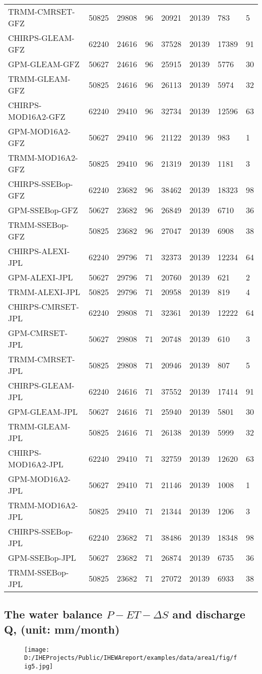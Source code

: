 \documentclass[oneside,openany]{article}%
\begin{document}
\begin{longtable}{|l|l|l|l|l|l|l|l|}
TRMM-CMRSET-GFZ&50825&29808&96&20921&20139&783&5\\%
CHIRPS-GLEAM-GFZ&62240&24616&96&37528&20139&17389&91\\%
GPM-GLEAM-GFZ&50627&24616&96&25915&20139&5776&30\\%
TRMM-GLEAM-GFZ&50825&24616&96&26113&20139&5974&32\\%
CHIRPS-MOD16A2-GFZ&62240&29410&96&32734&20139&12596&63\\%
GPM-MOD16A2-GFZ&50627&29410&96&21122&20139&983&1\\%
TRMM-MOD16A2-GFZ&50825&29410&96&21319&20139&1181&3\\%
CHIRPS-SSEBop-GFZ&62240&23682&96&38462&20139&18323&98\\%
GPM-SSEBop-GFZ&50627&23682&96&26849&20139&6710&36\\%
TRMM-SSEBop-GFZ&50825&23682&96&27047&20139&6908&38\\%
CHIRPS-ALEXI-JPL&62240&29796&71&32373&20139&12234&64\\%
GPM-ALEXI-JPL&50627&29796&71&20760&20139&621&2\\%
TRMM-ALEXI-JPL&50825&29796&71&20958&20139&819&4\\%
CHIRPS-CMRSET-JPL&62240&29808&71&32361&20139&12222&64\\%
GPM-CMRSET-JPL&50627&29808&71&20748&20139&610&3\\%
TRMM-CMRSET-JPL&50825&29808&71&20946&20139&807&5\\%
CHIRPS-GLEAM-JPL&62240&24616&71&37552&20139&17414&91\\%
GPM-GLEAM-JPL&50627&24616&71&25940&20139&5801&30\\%
TRMM-GLEAM-JPL&50825&24616&71&26138&20139&5999&32\\%
CHIRPS-MOD16A2-JPL&62240&29410&71&32759&20139&12620&63\\%
GPM-MOD16A2-JPL&50627&29410&71&21146&20139&1008&1\\%
TRMM-MOD16A2-JPL&50825&29410&71&21344&20139&1206&3\\%
CHIRPS-SSEBop-JPL&62240&23682&71&38486&20139&18348&98\\%
GPM-SSEBop-JPL&50627&23682&71&26874&20139&6735&36\\%
TRMM-SSEBop-JPL&50825&23682&71&27072&20139&6933&38\\%
\end{longtable}

%
\clearpage%
\cleardoublepage%
\subsection{The water balance $P-ET-\Delta S$ and discharge Q, (unit: mm/month)}%
\label{subsec:ThewaterbalanceP{-}ET{-}DeltaSanddischargeQ,(unitmm/month)}%


\begin{figure}[H]%
\centering%
\texttt{[image: D:/IHEProjects/Public/IHEWAreport/examples/data/area1/fig/fig5.jpg]}%
\label{figure:ann3}%
\end{figure}

%
\clearpage%
\cleardoublepage

%
\end{document}
